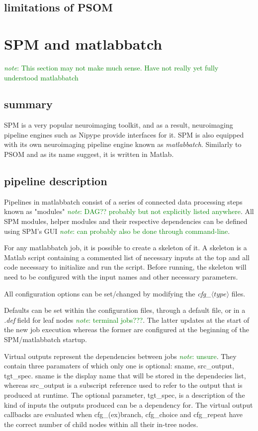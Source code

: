 \documentclass{report}
\newcommand{\note}[1]{\textcolor{green}{\textit{note}: #1}}
\begin{document}
        \subsection{limitations of PSOM}
    \section{SPM and matlabbatch} 
        \note{This section may not make much sense. Have not really yet fully
understood matlabbatch}
        \subsection{summary} 
        SPM is a very popular neuroimaging toolkit, and as a result,
neuroimaging pipeline engines such as Nipype provide interfaces for it. SPM is
also equipped with its own neuroimaging pipeline engine known as
\textit{matlabbatch}. Similarly to PSOM and as its name suggest, it is written
in Matlab.

        \subsection{pipeline description}
        Pipelines in matlabbatch consist of a series of connected data
processing steps known as "modules" \note{DAG?? probably but not explicitly
listed anywhere}. All SPM modules, helper modules and their respective
dependencies can be defined using SPM's GUI \note{can probably also be done
through command-line}.

        For any matlabbatch job, it is possible to create a skeleton of it. A
skeleton is a Matlab script containing a commented list of necessary inputs at
the top and all code necessary to initialize and run the script. Before running,
the skeleton will need to be configured with the input names and other
necessary parameters.

        All configuration options can be set/changed by modifying the
\textit{cfg\_$\langle type \rangle$ } files. 

        Defaults can be set within the configuration files, through a default
file, or in a \textit{.def} field for leaf nodes \note{terminal jobs???}. The
latter updates at the start of the new job execution whereas the former are
configured at the beginning of the SPM/matlabbatch startup.


        Virtual outputs represent the dependencies between jobs \note{unsure}.
They contain three paramaters of which only one is optional: sname, src\_output,
tgt\_spec. sname is the display name that will be stored in the dependecies
list, whereas src\_output is a subscript reference used to refer to the output
that is produced at runtime. The optional parameter, tgt\_spec, is a description
of the kind of inputs the outputs produced can be a dependency for. The virtual
output callbacks are evaluated when cfg\_(ex)branch, cfg\_choice and cfg\_repeat 
have the correct number of child nodes within all their in-tree nodes. 
\end{document}
